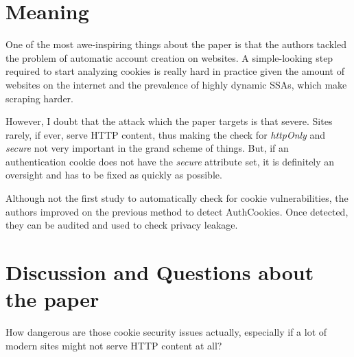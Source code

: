 \documentclass{article}
\begin{document}
\section{Meaning}

One of the most awe-inspiring things about the paper is that the authors tackled the problem of automatic account creation on websites. A simple-looking step required to start analyzing cookies is really hard in practice given the amount of websites on the internet and the prevalence of highly dynamic SSAs, which make scraping harder. 

However, I doubt that the attack which the paper targets is that severe. Sites rarely, if ever, serve HTTP content, thus making the check for \textit{httpOnly} and \textit{secure} not very important in the grand scheme of things. But, if an authentication cookie does not have the \textit{secure} attribute set, it is definitely an oversight and has to be fixed as quickly as possible.

Although not the first study to automatically check for cookie vulnerabilities, the authors improved on the previous method to detect AuthCookies. Once detected, they can be audited and used to check privacy leakage.


\section{Discussion and Questions about the paper}

How dangerous are those cookie security issues actually, especially if a lot of modern sites might not serve HTTP content at all?
\end{document}
